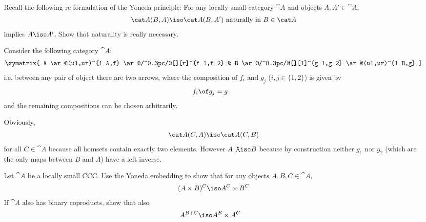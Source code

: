 \begin{exercise}
  Recall the following re-formulation of the Yoneda principle: For any locally small category $\cat A$ and objects $A,A'\in\cat A$:
  \begin{align*}
    \cat A(B,A)\iso \cat  A(B,A')\text{ naturally in } B\in\cat A
  \end{align*}
implies $A\iso A'$. Show that naturality is really necessary.
\end{exercise}
\begin{answer}
Consider the following category $\cat A$: 
\begin{align*}
  \xymatrix{
  A \ar@(ul,ur)^{1_A,f} \ar@/^0.3pc/@[][r]^{f_1,f_2} & B \ar@/^0.3pc/@[][l]^{g_1,g_2} \ar@(ul,ur)^{1_B,g}
                                                       } 
  \end{align*}
  i.e. between any pair of object there are two arrows, where the composition of $f_i$ and $g_j$ ($i,j\in\{1,2\}$) is given by
  \begin{align*}
    f_i\of g_j&=g
  \end{align*}
  and the remaining compositions can be chosen arbitrarily.
  
  Obviously,
  \begin{align*}
    \cat A(C,A)\iso\cat A(C,B)
  \end{align*}
  for all $C\in\cat A$ because all homsets contain exactly two elements. However $A\not\iso B$ because by construction neither $g_1$ nor $g_2$ (which are the only maps between $B$ and $A$) have a left inverse.
\end{answer}

\begin{exercise}
  Let $\cat A$ be a locally small CCC. Use the Yoneda embedding to show that for any objects $A,B,C\in\cat A$,
  \begin{align*}
    (A\times B)^C\iso A^C\times B^C
  \end{align*}
  If $\cat A$ also has binary coproducts, show that also
  \begin{align*}
    A^{B+C}&\iso A^B\times A^C
  \end{align*}
\end{exercise}

